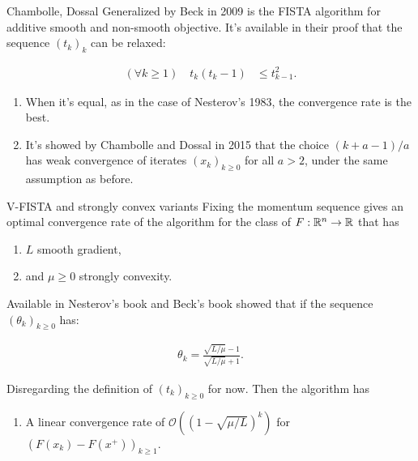 \documentclass[11pt]{beamer}
\theoremstyle{definition}
\begin{document}
        \begin{frame}{Chambolle, Dossal}
            Generalized by Beck \cite{beck_fast_2009-1} in 2009 is the FISTA algorithm for additive smooth and non-smooth objective. 
            It's available in their proof that the sequence $(t_k)_{k}$ can be relaxed: 
            \begin{tcolorbox}\noindent\vspace{-1em}
                \begin{align*}
                    (\forall k \ge 1)\quad t_k (t_k - 1) &\le t_{k - 1}^2. 
                \end{align*}    
            \end{tcolorbox}
            \begin{enumerate}
                \item When it's equal, as in the case of Nesterov's 1983, the convergence rate is the best. 
                \item It's showed by Chambolle and Dossal in 2015 \cite{chambolle_convergence_2015} that the choice $(k + a -1)/a$ has weak convergence of iterates $(x_k)_{k \ge 0}$ for all $a > 2$, under the same assumption as before. 
            \end{enumerate}
        \end{frame}
        \begin{frame}{V-FISTA and strongly convex variants}
            Fixing the momentum sequence gives an optimal convergence rate of the algorithm for the class of $F:\mathbb R^n \rightarrow \mathbb R$ that has 
            \begin{enumerate}
                \item $L$ smooth gradient, 
                \item and $\mu \ge 0$ strongly convexity. 
            \end{enumerate}
            Available in Nesterov's book \cite{nesterov_lectures_2018} and Beck's book \cite{beck_first-order_2017} showed that if the sequence $(\theta_k)_{k\ge 0}$ has: 
            \begin{tcolorbox}
                \begin{align*}
                   \theta_k = \frac{\sqrt{L/\mu} - 1}{\sqrt{L/\mu} + 1}. 
                \end{align*}
            \end{tcolorbox}
            Disregarding the definition of $(t_k)_{k \ge 0}$ for now. 
            Then the algorithm has
            \begin{enumerate}
                \item A linear convergence rate of $\mathcal O((1 - \sqrt{\mu/L})^k)$ for $(F(x_k) - F(x^+))_{k \ge 1}$. 
            \end{enumerate}
        \end{frame}
\end{document}
